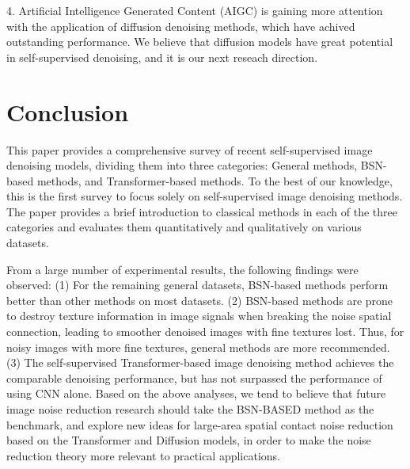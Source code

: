 \documentclass[conference]{IEEEtran}
\begin{document}
4.	Artificial Intelligence Generated Content (AIGC) is gaining more attention with the application of diffusion denoising methods\cite{fadnavis2020patch2self,yang2023real,kong2023comparison}, which have achived outstanding performance. We believe that diffusion models have great potential in self-supervised denoising, and it is our next reseach direction.

\section{Conclusion}
\label{sec:Section6}
This paper provides a comprehensive survey of recent self-supervised image denoising models, dividing them into three categories: General methods, BSN-based methods, and Transformer-based methods. To the best of our knowledge, this is the first survey to focus solely on self-supervised image denoising methods. The paper provides a brief introduction to classical methods in each of the three categories and evaluates them quantitatively and qualitatively on various datasets.

From a large number of experimental results, the following findings were observed: (1) For the remaining general datasets, BSN-based methods perform better than other methods on most datasets. (2) BSN-based methods are prone to destroy texture information in image signals when breaking the noise spatial connection, leading to smoother denoised images with fine textures lost. Thus, for noisy images with more fine textures, general methods are more recommended. (3) The self-supervised Transformer-based image denoising method achieves the comparable denoising performance, but has not surpassed the performance of using CNN alone. Based on the above analyses, we tend to believe that future image noise reduction research should take the BSN-BASED method as the benchmark, and explore new ideas for large-area spatial contact noise reduction based on the Transformer and Diffusion models, in order to make the noise reduction theory more relevant to practical applications.


{\small
	
	
}
\end{document}
